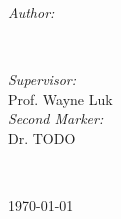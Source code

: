 \begin{titlepage}
  \begin{minipage}{0.4\textwidth}
  \begin{flushleft} \large
  \emph{Author:}\\
  \@author
  \end{flushleft}
  \end{minipage}
  ~
  \begin{minipage}{0.4\textwidth}
  \begin{flushright} \large
  \emph{Supervisor:} \\
  Prof. Wayne Luk \\[1.2em] %
  \emph{Second Marker:} \\
  Dr. TODO %
  \end{flushright}
  \end{minipage}\\[2cm]
  \makeatother
  
  
  \vspace*{\fill}
  {\large \today}\\[2cm] %
  
  \vfill %
  
  \end{titlepage}